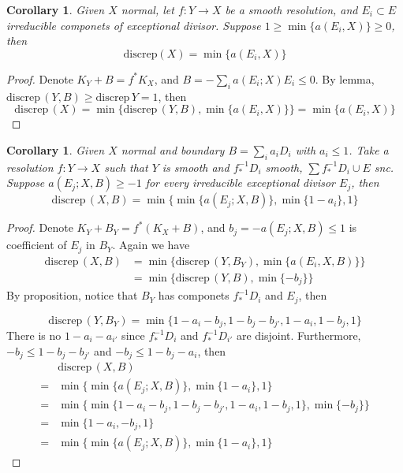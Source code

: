 \documentclass{article}
\newtheorem{cor}[defn]{Corollary}
\begin{document}
\begin{cor}
	Given $ X $ normal, let $ f:Y\to X $ be a smooth resolution, and  $E_i\subset  E $ irreducible componets of exceptional divisor. Suppose $ 1\geqslant \min\{a(E_i,X)\}\geqslant 0 $, then
	$$ \mathrm{discrep}(X)=\min\{a(E_i,X)\} $$
\end{cor}
\begin{proof}
	Denote $ K_Y+B=f^*K_X $, and $ B=-\sum_ia(E_i;X)E_i\leqslant0 $. By lemma, $ \mathrm{discrep}\,(Y,B)\geqslant \mathrm{discrep}\,Y=1 $, then
	$$ \mathrm{discrep}\,(X)=\min\{ \mathrm{discrep}\,(Y,B), \min\{a(E_i,X)\}\} =\min\{a(E_i,X)\}$$
\end{proof}
\begin{cor}
	Given  $ X $ normal and boundary $ B=\sum_ia_iD_i $ with $ a_i\leqslant 1 $. Take a resolution $ f:Y\to X $ such that $ Y $ is smooth and $ f^{-1}_*D_i $ smooth, $ \sum f^{-1}_*D_i \cup E$ snc. Suppose $ a(E_j;X,B)\geqslant -1 $ for every irreducible exceptional divisor $ E_j $, then
	$$ \mathrm{discrep}\, (X,B)=\min\{\min\{a(E_j;X,B)\},\min\{1-a_i\},1\} $$
\end{cor}
\begin{proof}
	Denote $ K_Y+B_Y=f^*(K_X+B) $, and $ b_j=-a(E_j;X,B)\leqslant 1 $ is coefficient of $ E_j $ in $ B_Y $. Again we have
	\begin{equation*}
	\begin{aligned}
	\mathrm{discrep}\,(X,B)&=\min\{ \mathrm{discrep}\,(Y,B_Y), \min\{a(E_i,X,B)\}\}\\
	&=\min\{ \mathrm{discrep}\,(Y,B), \min\{-b_j\}\}
	\end{aligned}
	\end{equation*}
	By proposition,  notice that $ B_Y $ has componets $ f^{-1}_*D_i $ and $ E_j $, then
	
	$$ \mathrm{discrep}\,(Y,B_Y)=\min \{ 1-a_i-b_j, 1-b_j-b_{j'}, 1-a_i, 1-b_j,1 \} $$
	There is no $ 1-a_i-a_{i'} $ since $ f^{-1}_*D_i $ and $ f^{-1}_*D_{i'} $ are disjoint. Furthermore, $ -b_j\leqslant 1-b_j-b_{j'} $ and $ -b_j\leqslant 1-b_j-a_i $, then 
	\begin{equation*}
	\begin{aligned}
	&\mathrm{discrep}\, (X,B)\\
	=&\min\{\min\{a(E_j;X,B)\},\min\{1-a_i\},1\}\\
	=&\min\{ \min \{ 1-a_i-b_j, 1-b_j-b_{j'}, 1-a_i, 1-b_j,1 \}, \min\{-b_j\}\} \\
	=&\min\{  1-a_i,-b_j,1 \} \\
	=&\min\{\min\{a(E_j;X,B)\},\min\{1-a_i\},1\}
	\end{aligned}
	\end{equation*}
	
\end{proof}
\end{document}
